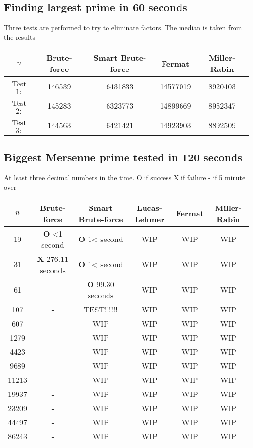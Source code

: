 \documentclass[main.tex]{subfiles}
\begin{document}
\subsection{Finding largest prime in 60 seconds}

Three tests are performed to try to eliminate factors. The median is taken from
the results.

\begin{table}[ht!]
  \centering
  \begin{tabular}{||c c c c c||}
    \hline
    $n$ & Brute-force & Smart Brute-force & Fermat & Miller-Rabin \\ [0.5ex] 
    \hline\hline
    Test $1:$ & 146539 & 6431833 & 14577019 & 8920403\\ 
    Test $2:$ & 145283 & 6323773 & 14899669 & 8952347\\ 
    Test $3:$ & 144563 & 6421421 & 14923903 & 8892509\\   [1ex] 
    \hline
  \end{tabular}
\end{table}

\subsection{Biggest Mersenne prime tested in 120 seconds}

At least three decimal numbers in the time.
O if success
X if failure
- if 5 minute over

\begin{table}[ht!]
  \centering
  \begin{tabular}{||c c c c c c||}
    \hline
    $n$ & Brute-force & Smart Brute-force & Lucas-Lehmer & Fermat & Miller-Rabin  \\ [0.5ex] 
    \hline\hline
    19 & \textbf{O} <1 second & \textbf{O} 1< second & WIP & WIP & WIP\\
    31 & \textbf{X} 276.11 seconds & \textbf{O} 1< second & WIP & WIP & WIP\\
    61 & - & \textbf{O} 99.30 seconds & WIP & WIP & WIP\\
    107 & - & TEST!!!!!! & WIP & WIP & WIP\\
    607 & - & WIP & WIP & WIP & WIP\\
    1279 & - & WIP & WIP & WIP & WIP\\
    4423 & - & WIP & WIP & WIP & WIP\\
    9689 & - & WIP & WIP & WIP & WIP\\
    11213 & - & WIP & WIP & WIP & WIP\\
    19937 & - & WIP & WIP & WIP & WIP\\
    23209 & - & WIP & WIP & WIP & WIP\\ 
    44497 & - & WIP & WIP & WIP & WIP\\ 
    86243 & - & WIP & WIP & WIP & WIP\\  [1ex] 
    \hline
  \end{tabular}
\end{table}
\end{document}
